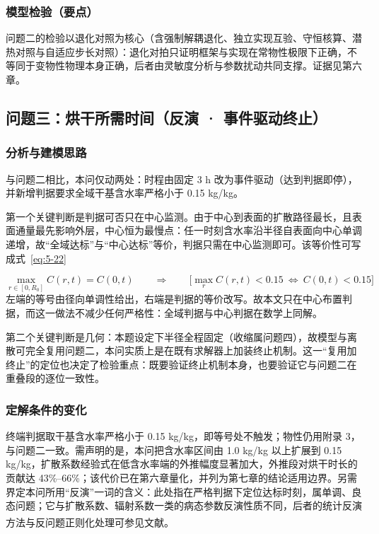 \subsubsection{模型检验（要点）}
问题二的检验以退化对照为核心（含强制解耦退化、独立实现互验、守恒核算、潜热对照与自适应步长对照）：退化对拍只证明框架与实现在常物性极限下正确，不等同于变物性物理本身正确，后者由灵敏度分析与参数扰动共同支撑。证据见第六章。

\subsection{问题三：烘干所需时间（反演 · 事件驱动终止）}
\subsubsection{分析与建模思路}
与问题二相比，本问仅动两处：时程由固定 3 h 改为事件驱动（达到判据即停），并新增判据要求全域干基含水率严格小于 0.15 kg/kg。

第一个关键判断是判据可否只在中心监测。由于中心到表面的扩散路径最长，且表面通量最先影响外层，中心恒为最慢点：任一时刻含水率沿半径自表面向中心单调递增，故“全域达标”与“中心达标”等价，判据只需在中心监测即可。该等价性可写成式~\eqref{eq:5-22}

\begin{equation}
  \max_{r\in[0,R_0]}C(r,t)=C(0,t)\qquad\Longrightarrow\qquad \Big[\max_{r}C(r,t)<0.15\ \Longleftrightarrow\ C(0,t)<0.15\Big]
  \label{eq:5-22}
\end{equation}
左端的等号由径向单调性给出，右端是判据的等价改写。故本文只在中心布置判据，而这一做法不减少任何严格性：全域判据与中心判据在数学上同解。

第二个关键判断是几何：本题设定下半径全程固定（收缩属问题四），故模型与离散可完全复用问题二，本问实质上是在既有求解器上加装终止机制。这一“复用加终止”的定位也决定了检验重点：既要验证终止机制本身，也要验证它与问题二在重叠段的逐位一致性。

\subsubsection{定解条件的变化}
终端判据取干基含水率严格小于 0.15 kg/kg，即等号处不触发；物性仍用附录 3，与问题二一致。需声明的是，本问把含水率区间由 1.0 kg/kg 以上扩展到 0.15 kg/kg，扩散系数经验式在低含水率端的外推幅度显著加大，外推段对烘干时长的贡献达 43\%–66\%；该代价已在第六章量化，并列为第七章的结论适用边界。另需界定本问所用“反演”一词的含义：此处指在严格判据下定位达标时刻，属单调、良态问题；它与扩散系数、辐射系数一类的病态参数反演性质不同，后者的统计反演方法与反问题正则化处理可参见文献\textsuperscript{\cite{ref19,ref20}}。

